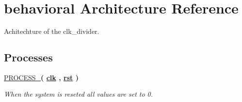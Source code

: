 \hypertarget{classclk__divide_1_1behavioral}{\section{behavioral Architecture Reference}
\label{classclk__divide_1_1behavioral}
}


Achitechture of the clk\-\_\-divider.  


\subsection*{Processes}
 \begin{DoxyCompactItemize}
\item 
\hypertarget{classclk__divide_1_1behavioral_aae31a4dbedaf43cbd1619c642270813b}{\hyperlink{classclk__divide_1_1behavioral_aae31a4dbedaf43cbd1619c642270813b}{P\-R\-O\-C\-E\-S\-S\-\_}{\bfseries  ( {\bfseries {\bfseries \hyperlink{classclk__divide_a8120037e0ee47c35ba2d79242209c72e}{clk}} \textcolor{vhdlchar}{ }\textcolor{vhdlchar}{ }\textcolor{vhdlchar}{ }} , {\bfseries {\bfseries \hyperlink{classclk__divide_aa7b7040844189161771c36cf6bbf172c}{rst}} \textcolor{vhdlchar}{ }} )}}\label{classclk__divide_1_1behavioral_aae31a4dbedaf43cbd1619c642270813b}

\begin{DoxyCompactList}\small\item\em When the system is reseted all values are set to 0. \end{DoxyCompactList}\end{DoxyCompactItemize}
